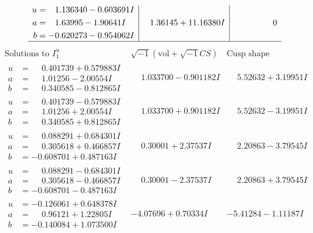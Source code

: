 \documentclass[1p]{elsarticle_modified}
\theoremstyle{definition}
\newcommand{\I}{\sqrt{-1}}
\begin{document}
$$\begin{array}{c|c|c}
\begin{aligned}
u &= \phantom{-}1.136340 - 0.603691 I \\
a &= \phantom{-}1.63995 - 1.90641 I \\
b &= -0.620273 - 0.954062 I\end{aligned}
 & \phantom{-}1.36145 + 11.16380 I & \phantom{-0.000000 } 0\\
 \hline 
 \end{array}$$\newpage$$\begin{array}{c|c|c}  
\text{Solutions to }I^u_{1}& \I (\text{vol} + \sqrt{-1}CS) & \text{Cusp shape}\\
 \hline 
\begin{aligned}
u &= \phantom{-}0.401739 + 0.579883 I \\
a &= \phantom{-}1.01256 - 2.00554 I \\
b &= \phantom{-}0.340585 - 0.812865 I\end{aligned}
 & \phantom{-}1.033700 - 0.901182 I & \phantom{-}5.52632 + 3.19951 I \\ \hline\begin{aligned}
u &= \phantom{-}0.401739 - 0.579883 I \\
a &= \phantom{-}1.01256 + 2.00554 I \\
b &= \phantom{-}0.340585 + 0.812865 I\end{aligned}
 & \phantom{-}1.033700 + 0.901182 I & \phantom{-}5.52632 - 3.19951 I \\ \hline\begin{aligned}
u &= \phantom{-}0.088291 + 0.684301 I \\
a &= \phantom{-}0.305618 + 0.466857 I \\
b &= -0.608701 + 0.487163 I\end{aligned}
 & \phantom{-}0.30001 + 2.37537 I & \phantom{-}2.20863 - 3.79545 I \\ \hline\begin{aligned}
u &= \phantom{-}0.088291 - 0.684301 I \\
a &= \phantom{-}0.305618 - 0.466857 I \\
b &= -0.608701 - 0.487163 I\end{aligned}
 & \phantom{-}0.30001 - 2.37537 I & \phantom{-}2.20863 + 3.79545 I \\ \hline\begin{aligned}
u &= -0.126061 + 0.648378 I \\
a &= \phantom{-}0.96121 + 1.22805 I \\
b &= -0.140084 + 1.073500 I\end{aligned}
 & -4.07696 + 0.70334 I & -5.41284 - 1.11187 I \\ \hline\begin{aligned}

\end{aligned}
\end{array}$$
\end{document}
